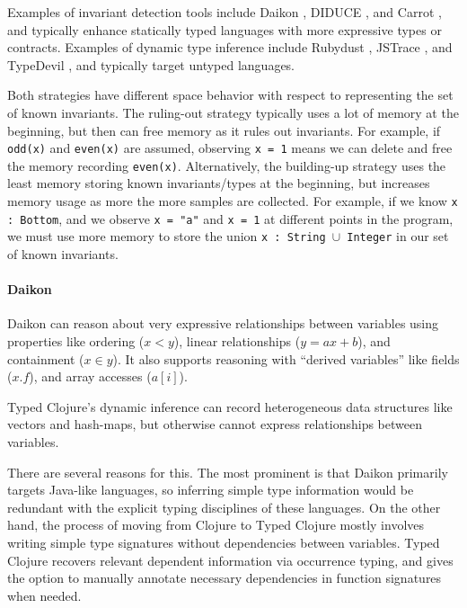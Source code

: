 \documentclass[9pt]{extarticle}
\begin{document}
Examples of invariant detection tools include Daikon \cite{Ernst06thedaikon},
DIDUCE \cite{hangal2002tracking}, and Carrot \cite{pytlik2003automated}, and
typically enhance statically typed languages with more expressive types or contracts.
Examples of dynamic type inference include Rubydust \cite{An10dynamicinference},
JSTrace \cite{saftoiu2010jstrace}, and TypeDevil \cite{pradel2015typedevil},
and typically target untyped languages.

Both strategies have different space behavior with respect to representing
the set of known invariants.
The ruling-out strategy typically uses a lot of memory at the beginning,
but then can free memory as it rules out invariants. For example, if
\texttt{odd(x)} and \texttt{even(x)} are assumed, observing \texttt{x = 1}
means we can delete and free the memory recording \texttt{even(x)}.
Alternatively, the building-up strategy uses the least memory storing
known invariants/types at the beginning, but increases memory usage
as more the more samples are collected. For example, if we know
\texttt{x : Bottom}, and we observe \texttt{x = "a"} and \texttt{x = 1}
at different points in the program, we must use more memory to
store the union \texttt{x : String $\cup$ Integer} in our set of known invariants.

\paragraph{Daikon}
Daikon can reason about very expressive relationships between variables
using properties like ordering ($x < y$), linear relationships ($y = ax + b$),
and containment ($x \in y$). It also supports reasoning with ``derived variables''
like fields ($x.f$), and array accesses ($a[i]$).

Typed Clojure's dynamic inference can record heterogeneous data structures
like vectors and hash-maps, but otherwise cannot express relationships
between variables.

There are several reasons for this. The most prominent is that Daikon
primarily targets Java-like languages, so inferring simple type information
would be redundant with the explicit typing disciplines of these languages.
On the other hand, the process of moving from Clojure to Typed Clojure
mostly involves writing simple type signatures without dependencies
between variables. Typed Clojure recovers relevant dependent information
via occurrence typing, and gives the option to manually annotate necessary
dependencies in function signatures when needed.
\end{document}
